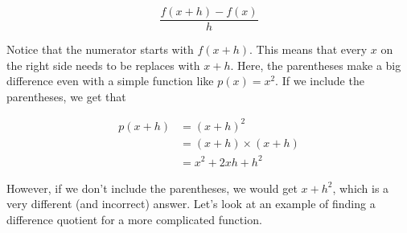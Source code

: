 \begin{equation}\label{eqn:difference_quotient}
	\frac{f(x+h) - f(x)}{h}
\end{equation}

Notice that the numerator starts with $f(x+h)$. This means that every $x$ on the right side needs to be replaces with $x+h$. Here, the parentheses make a big difference even with a simple function like $p(x)=x^2$. If we include the parentheses, we get that 

\begin{equation}\label{eqn:p(x+h)}
	\begin{split}
		p(x+h) & = (x+h)^2 \\
		       & = (x+h)\times (x+h) \\
		       & = x^2+2xh+h^2
	\end{split}
\end{equation}

However, if we don't include the parentheses, we would get $x+h^2$, which is a very different (and incorrect) answer. Let's look at an example of finding a difference quotient for a more complicated function.


